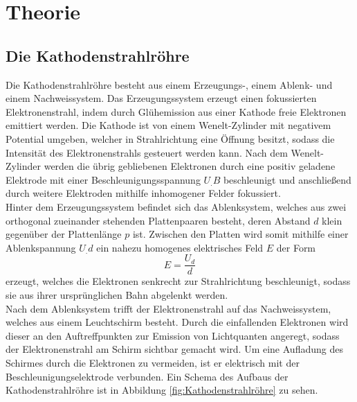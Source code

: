 
\section{Theorie}
\label{sec:Theorie}

\subsection{Die Kathodenstrahlröhre}

Die Kathodenstrahlröhre besteht aus einem Erzeugungs-, einem Ablenk- und einem Nachweissystem.
Das Erzeugungssystem erzeugt einen fokussierten Elektronenstrahl, indem durch Glühemission aus einer Kathode freie Elektronen emittiert werden. Die Kathode ist von einem Wenelt-Zylinder mit negativem Potential umgeben, welcher in Strahlrichtung eine Öffnung besitzt, sodass die Intensität des Elektronenstrahls gesteuert werden kann.
Nach dem Wenelt-Zylinder werden die übrig gebliebenen Elektronen durch eine positiv geladene Elektrode mit einer Beschleunigungsspannung $U_.B$ beschleunigt und anschließend durch weitere Elektroden mithilfe inhomogener Felder fokussiert.\\
Hinter dem Erzeugungssystem befindet sich das Ablenksystem, welches aus zwei orthogonal zueinander stehenden Plattenpaaren besteht, deren Abstand $d$ klein gegenüber der Plattenlänge $p$ ist. Zwischen den Platten wird somit mithilfe einer Ablenkspannung $U_.d$ ein nahezu homogenes elektrisches Feld $E$ der Form
\begin{equation}
E = \frac{U_d}{d}\label{eq:E}
\end{equation} 
erzeugt, welches die Elektronen senkrecht zur Strahlrichtung beschleunigt, sodass sie aus ihrer ursprünglichen Bahn abgelenkt werden.\\
Nach dem Ablenksystem trifft der Elektronenstrahl auf das Nachweissystem, welches aus einem Leuchtschirm besteht. Durch die einfallenden Elektronen wird dieser an den Auftreffpunkten zur Emission von Lichtquanten angeregt, sodass der Elektronenstrahl am Schirm sichtbar gemacht wird. Um eine Aufladung des Schirmes durch die Elektronen zu vermeiden, ist er elektrisch mit der Beschleunigungselektrode verbunden. Ein Schema des Aufbaus der Kathodenstrahlröhre ist in Abbildung \ref{fig:Kathodenstrahlröhre} zu sehen.   

